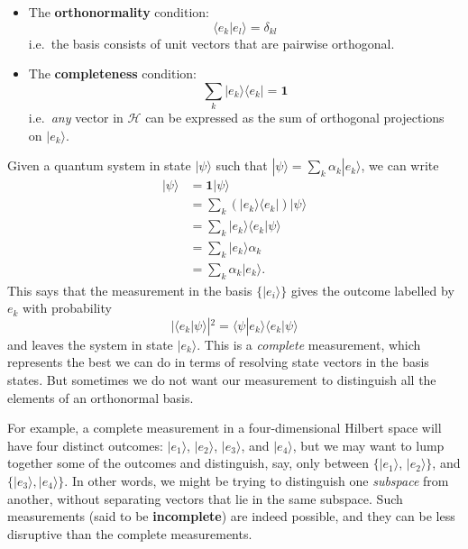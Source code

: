 \documentclass[fleqn]{article}
\providecommand{\tightlist}{%
  \setlength{\itemsep}{0pt}\setlength{\parskip}{0pt}}
\newenvironment{idea}{\noindent}{\medskip}
\begin{document}
\begin{idea}

\begin{itemize}
\tightlist
\item
  The \textbf{orthonormality} condition:
  \[
      \langle e_k|e_l\rangle = \delta_{kl}
    \]
  i.e.~the basis consists of unit vectors that are pairwise orthogonal.
\item
  The \textbf{completeness} condition:
  \[
      \sum_k|e_k\rangle\langle e_k| = \mathbf{1}
    \]
  i.e.~\emph{any} vector in \(\mathcal{H}\) can be expressed as the sum of orthogonal projections on \(|e_k\rangle\).
\end{itemize}

\end{idea}

Given a quantum system in state \(|\psi\rangle\) such that \(|\psi\rangle = \sum_k \alpha_k|e_k\rangle\), we can write
\[
  \begin{aligned}
    |\psi\rangle
    &= \mathbf{1}|\psi\rangle
  \\&= \sum_k (|e_k\rangle\langle e_k|) |\psi\rangle
  \\&= \sum_k |e_k\rangle\langle e_k|\psi\rangle
  \\&= \sum_k |e_k\rangle\alpha_k
  \\&= \sum_k \alpha_k|e_k\rangle.
  \end{aligned}
\]
This says that the measurement in the basis \(\{|e_i\rangle\}\) gives the outcome labelled by \(e_k\) with probability
\[
  |\langle e_k|\psi\rangle|^2 = \langle\psi|e_k\rangle\langle e_k|\psi\rangle
\]
and leaves the system in state \(|e_k\rangle\).
This is a \emph{complete} measurement, which represents the best we can do in terms of resolving state vectors in the basis states.
But sometimes we do not want our measurement to distinguish all the elements of an orthonormal basis.

For example, a complete measurement in a four-dimensional Hilbert space will have four distinct outcomes: \(|e_1\rangle\), \(|e_2\rangle\), \(|e_3\rangle\), and \(|e_4\rangle\), but we may want to lump together some of the outcomes and distinguish, say, only between \(\{|e_1\rangle\), \(|e_2\rangle\}\), and \(\{|e_3\rangle,|e_4\rangle\}\).
In other words, we might be trying to distinguish one \emph{subspace} from another, without separating vectors that lie in the same subspace.
Such measurements (said to be \textbf{incomplete}) are indeed possible, and they can be less disruptive than the complete measurements.
\end{document}
